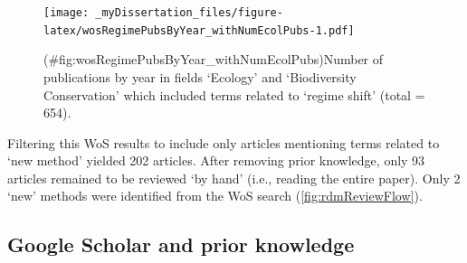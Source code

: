 \documentclass[12pt,twoside,openany]{reedthesis}
\begin{document}
\begin{figure}
\centering
\texttt{[image: \_myDissertation\_files/figure-latex/wosRegimePubsByYear\_withNumEcolPubs-1.pdf]}
\caption{(\#fig:wosRegimePubsByYear\_withNumEcolPubs)Number of
publications by year in fields `Ecology' and `Biodiversity Conservation'
which included terms related to `regime shift' (total = 654).}
\end{figure}
Filtering this WoS results to include only articles mentioning terms
related to `new method' yielded 202 articles. After removing prior
knowledge, only 93 articles remained to be reviewed `by hand' (i.e.,
reading the entire paper). Only 2 `new' methods were identified from the
WoS search (\ref{fig:rdmReviewFlow}).

\subsection{Google Scholar and prior
knowledge}\label{google-scholar-and-prior-knowledge}
\end{document}
